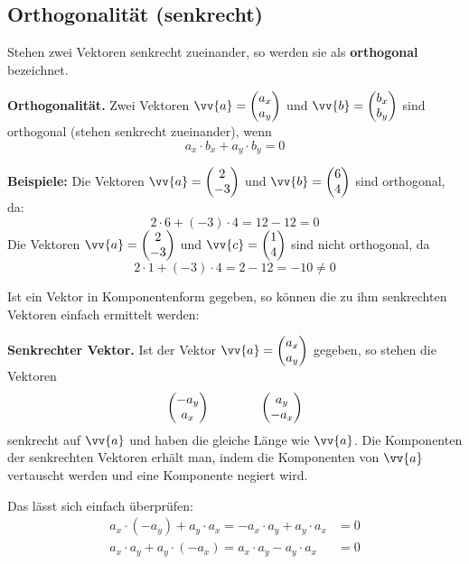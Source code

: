 \subsection{Orthogonalität (senkrecht)}

Stehen zwei Vektoren senkrecht zueinander, so werden sie als \textbf{orthogonal} bezeichnet.

\begin{theorem}
  \textbf{Orthogonalität.} Zwei Vektoren $\vv{a} = \vxy{a_{x}}{a_{y}}$ und $\vv{b} = \vxy{b_{x}}{b_{y}}$ sind orthogonal (stehen senkrecht zueinander), wenn
  \[
    a_{x}\cdot b_{x}+a_{y}\cdot b_{y} = 0
  \]
\end{theorem}

\begin{center}
\end{center}

\begin{example}
  \textbf{Beispiele:} Die Vektoren $\vv{a} = \vxy{2}{-3}$ und $\vv{b} = \vxy{6}{4}$ sind orthogonal, da:
  \[
    2\cdot 6 + (-3)\cdot 4 = 12 - 12 = 0
  \]
  Die Vektoren $\vv{a} = \vxy{2}{-3}$ und $\vv{c} = \vxy{1}{4}$ sind nicht orthogonal, da
  \[
    2\cdot 1 + (-3)\cdot 4 = 2-12 = -10 \ne 0
  \]
\end{example}

Ist ein Vektor in Komponentenform gegeben, so können die zu ihm senkrechten Vektoren einfach ermittelt werden:

\begin{theorem}
  \textbf{Senkrechter Vektor.} Ist der Vektor $\vv{a} = \vxy{a_{x}}{a_{y}}$ gegeben, so stehen die Vektoren
  \[
    \begin{pmatrix}-a_{y}\\a_{x}\end{pmatrix} \qquad\qquad \begin{pmatrix}a_{y}\\-a_{x}\end{pmatrix}
  \]
  senkrecht auf $\vv{a}$ und haben die gleiche Länge wie $\vv{a}$. Die Komponenten der senkrechten Vektoren erhält man, indem die Komponenten von $\vv{a}$ vertauscht werden und eine Komponente negiert wird.
\end{theorem}
Das lässt sich einfach überprüfen:
\begin{align*}
  a_{x}\cdot(-a_{y})+a_{y}\cdot a_{x} = -a_{x}\cdot a_{y}+a_{y}\cdot a_{x} &= 0 \\
  a_{x}\cdot a_{y}+a_{y}\cdot(-a_{x}) = a_{x}\cdot a_{y}-a_{y}\cdot a_{x} &= 0
\end{align*}


